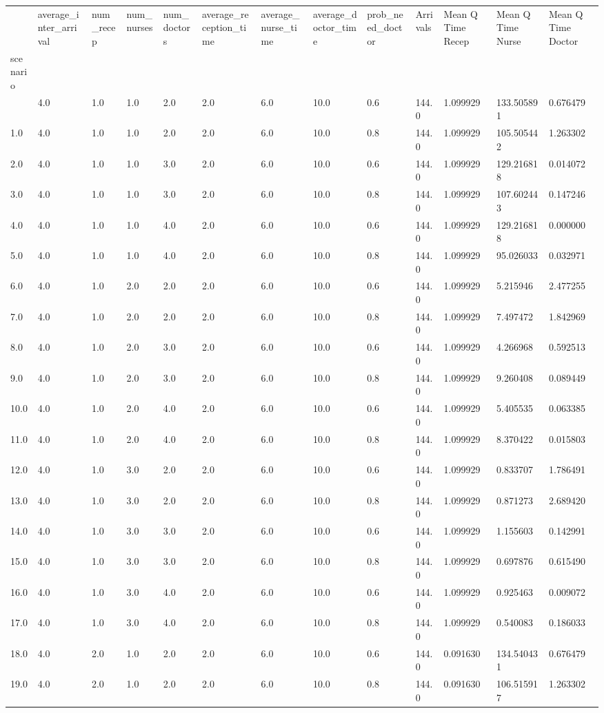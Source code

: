 \documentclass[
  letterpaper,
  DIV=11,
  numbers=noendperiod]{scrreprt}
\begin{document}
\begin{longtable}[]{@{}lllllllllllll@{}}
\toprule\noalign{}
& average\_inter\_arrival & num\_recep & num\_nurses & num\_doctors &
average\_reception\_time & average\_nurse\_time & average\_doctor\_time
& prob\_need\_doctor & Arrivals & Mean Q Time Recep & Mean Q Time Nurse
& Mean Q Time Doctor \\
scenario & & & & & & & & & & & & \\
\midrule\noalign{}
\endhead
\bottomrule\noalign{}
\endlastfoot
0.0 & 4.0 & 1.0 & 1.0 & 2.0 & 2.0 & 6.0 & 10.0 & 0.6 & 144.0 & 1.099929
& 133.505891 & 0.676479 \\
1.0 & 4.0 & 1.0 & 1.0 & 2.0 & 2.0 & 6.0 & 10.0 & 0.8 & 144.0 & 1.099929
& 105.505442 & 1.263302 \\
2.0 & 4.0 & 1.0 & 1.0 & 3.0 & 2.0 & 6.0 & 10.0 & 0.6 & 144.0 & 1.099929
& 129.216818 & 0.014072 \\
3.0 & 4.0 & 1.0 & 1.0 & 3.0 & 2.0 & 6.0 & 10.0 & 0.8 & 144.0 & 1.099929
& 107.602443 & 0.147246 \\
4.0 & 4.0 & 1.0 & 1.0 & 4.0 & 2.0 & 6.0 & 10.0 & 0.6 & 144.0 & 1.099929
& 129.216818 & 0.000000 \\
5.0 & 4.0 & 1.0 & 1.0 & 4.0 & 2.0 & 6.0 & 10.0 & 0.8 & 144.0 & 1.099929
& 95.026033 & 0.032971 \\
6.0 & 4.0 & 1.0 & 2.0 & 2.0 & 2.0 & 6.0 & 10.0 & 0.6 & 144.0 & 1.099929
& 5.215946 & 2.477255 \\
7.0 & 4.0 & 1.0 & 2.0 & 2.0 & 2.0 & 6.0 & 10.0 & 0.8 & 144.0 & 1.099929
& 7.497472 & 1.842969 \\
8.0 & 4.0 & 1.0 & 2.0 & 3.0 & 2.0 & 6.0 & 10.0 & 0.6 & 144.0 & 1.099929
& 4.266968 & 0.592513 \\
9.0 & 4.0 & 1.0 & 2.0 & 3.0 & 2.0 & 6.0 & 10.0 & 0.8 & 144.0 & 1.099929
& 9.260408 & 0.089449 \\
10.0 & 4.0 & 1.0 & 2.0 & 4.0 & 2.0 & 6.0 & 10.0 & 0.6 & 144.0 & 1.099929
& 5.405535 & 0.063385 \\
11.0 & 4.0 & 1.0 & 2.0 & 4.0 & 2.0 & 6.0 & 10.0 & 0.8 & 144.0 & 1.099929
& 8.370422 & 0.015803 \\
12.0 & 4.0 & 1.0 & 3.0 & 2.0 & 2.0 & 6.0 & 10.0 & 0.6 & 144.0 & 1.099929
& 0.833707 & 1.786491 \\
13.0 & 4.0 & 1.0 & 3.0 & 2.0 & 2.0 & 6.0 & 10.0 & 0.8 & 144.0 & 1.099929
& 0.871273 & 2.689420 \\
14.0 & 4.0 & 1.0 & 3.0 & 3.0 & 2.0 & 6.0 & 10.0 & 0.6 & 144.0 & 1.099929
& 1.155603 & 0.142991 \\
15.0 & 4.0 & 1.0 & 3.0 & 3.0 & 2.0 & 6.0 & 10.0 & 0.8 & 144.0 & 1.099929
& 0.697876 & 0.615490 \\
16.0 & 4.0 & 1.0 & 3.0 & 4.0 & 2.0 & 6.0 & 10.0 & 0.6 & 144.0 & 1.099929
& 0.925463 & 0.009072 \\
17.0 & 4.0 & 1.0 & 3.0 & 4.0 & 2.0 & 6.0 & 10.0 & 0.8 & 144.0 & 1.099929
& 0.540083 & 0.186033 \\
18.0 & 4.0 & 2.0 & 1.0 & 2.0 & 2.0 & 6.0 & 10.0 & 0.6 & 144.0 & 0.091630
& 134.540431 & 0.676479 \\
19.0 & 4.0 & 2.0 & 1.0 & 2.0 & 2.0 & 6.0 & 10.0 & 0.8 & 144.0 & 0.091630
& 106.515917 & 1.263302 \\
\end{longtable}
\end{document}
